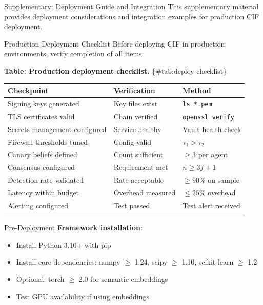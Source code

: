 \documentclass[
  ignorenonframetext,
]{beamer}
\author{\texorpdfstring{}{}}
\date{}
\newcounter{none} %
\begin{document}
\begin{frame}
\newpage
\end{frame}

\begin{frame}[fragile]{Supplementary: Deployment Guide and Integration}
\protect{}\label{sec:deployment}
This supplementary material provides deployment considerations and
integration examples for production CIF deployment.

\begin{block}{Production Deployment Checklist}
\protect{}\label{sec:production-checklist}
Before deploying CIF in production environments, verify completion of
all items:

\textbf{Table: Production deployment checklist.}
\{\#tab:deploy-checklist\}

{\def\LTcaptype{none} %
\begin{longtable}[]{@{}lll@{}}
\toprule\noalign{}
Checkpoint & Verification & Method \\
\midrule\noalign{}
\endhead
Signing keys generated & Key files exist & \texttt{ls\ *.pem} \\
TLS certificates valid & Chain verified & \texttt{openssl\ verify} \\
Secrets management configured & Service healthy & Vault health check \\
Firewall thresholds tuned & Config valid & \(\tau_1 > \tau_2\) \\
Canary beliefs defined & Count sufficient & \(\geq 3\) per agent \\
Consensus configured & Requirement met & \(n \geq 3f + 1\) \\
Detection rate validated & Rate acceptable & \(\geq 90\%\) on sample \\
Latency within budget & Overhead measured & \(\leq 25\%\) overhead \\
Alerting configured & Test passed & Test alert received \\
\bottomrule\noalign{}
\end{longtable}
}
\end{block}

\begin{block}{Pre-Deployment}
\protect{}\label{sec:pre-deploy}
\textbf{Framework installation}:

\begin{itemize}
\item Install Python 3.10+ with pip
\item Install core dependencies: numpy $\geq$ 1.24, scipy $\geq$ 1.10, scikit-learn $\geq$ 1.2
\item Optional: torch $\geq$ 2.0 for semantic embeddings
\item Test GPU availability if using embeddings
\end{itemize}


\end{block}
\end{frame}
\end{document}

